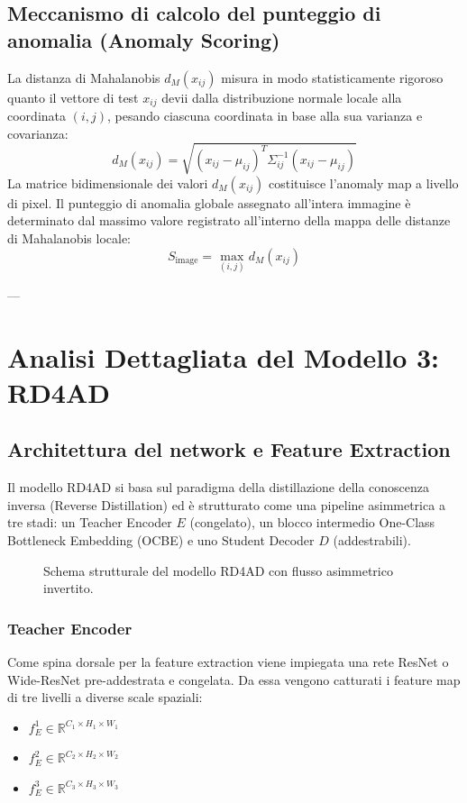 \subsection{Meccanismo di calcolo del punteggio di anomalia (Anomaly Scoring)}
La distanza di Mahalanobis $d_M(x_{ij})$ misura in modo statisticamente rigoroso quanto il vettore di test $x_{ij}$ devii dalla distribuzione normale locale alla coordinata $(i,j)$, pesando ciascuna coordinata in base alla sua varianza e covarianza:
\begin{equation}
    d_M(x_{ij}) = \sqrt{(x_{ij} - \mu_{ij})^T \Sigma_{ij}^{-1} (x_{ij} - \mu_{ij})}
\end{equation}
La matrice bidimensionale dei valori $d_M(x_{ij})$ costituisce l'anomaly map a livello di pixel.
Il punteggio di anomalia globale assegnato all'intera immagine è determinato dal massimo valore registrato all'interno della mappa delle distanze di Mahalanobis locale:
\begin{equation}
    S_{\text{image}} = \max_{(i, j)} d_M(x_{ij})
\end{equation}

---

\section{Analisi Dettagliata del Modello 3: RD4AD}

\subsection{Architettura del network e Feature Extraction}
Il modello RD4AD si basa sul paradigma della distillazione della conoscenza inversa (Reverse Distillation) ed è strutturato come una pipeline asimmetrica a tre stadi: un Teacher Encoder $E$ (congelato), un blocco intermedio One-Class Bottleneck Embedding (OCBE) e uno Student Decoder $D$ (addestrabili).

\begin{figure}[ht]
\centering
\caption{Schema strutturale del modello RD4AD con flusso asimmetrico invertito.}
\label{fig:rd4ad}
\end{figure}

\subsubsection{Teacher Encoder}
Come spina dorsale per la feature extraction viene impiegata una rete ResNet o Wide-ResNet pre-addestrata e congelata. Da essa vengono catturati i feature map di tre livelli a diverse scale spaziali:
\begin{itemize}
    \item $f_E^1 \in \mathbb{R}^{C_1 \times H_1 \times W_1}$
    \item $f_E^2 \in \mathbb{R}^{C_2 \times H_2 \times W_2}$
    \item $f_E^3 \in \mathbb{R}^{C_3 \times H_3 \times W_3}$
\end{itemize}

